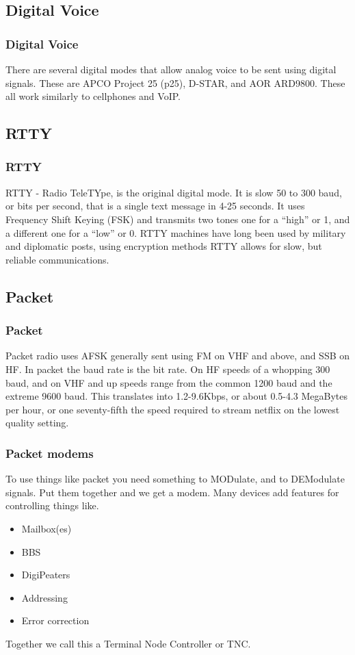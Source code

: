 \documentclass[10pt, handout]{beamer}
\begin{document}
\subsection{Digital Voice}

\begin{frame}
\frametitle{Digital Voice}
There are several digital modes that allow analog voice to be sent using digital signals. These are APCO Project 25 (p25), D-STAR, and AOR ARD9800. These all work similarly to cellphones and VoIP.
\end{frame}

\subsection{RTTY}

\begin{frame}
\frametitle{RTTY}
RTTY - Radio TeleTYpe, is the original digital mode. It is slow 50 to 300 baud, or bits per second, that is a single text message in 4-25 seconds. It uses Frequency Shift Keying (FSK) and transmits two tones one for a ``high'' or 1, and a different one for a ``low'' or 0. RTTY machines have long been used by military and diplomatic posts, using encryption methods RTTY allows for slow, but reliable communications.
\end{frame}

\subsection{Packet}

\begin{frame}
\frametitle{Packet}
Packet radio uses AFSK generally sent using FM on VHF and above, and SSB on HF. In packet the baud rate is the bit rate. On HF speeds of a whopping 300 baud, and on VHF and up speeds range from the common 1200 baud and the extreme 9600 baud. This translates into 1.2-9.6Kbps, or about 0.5-4.3 MegaBytes per hour, or one seventy-fifth the speed required to stream netflix on the lowest quality setting.
\end{frame}

\begin{frame}
\frametitle{Packet modems}
To use things like packet you need something to MODulate, and to DEModulate signals. Put them together and we get a modem. Many devices add features for controlling things like.\\
\begin{itemize}
\item Mailbox(es)
\item BBS
\item DigiPeaters
\item Addressing
\item Error correction
\end{itemize}
Together we call this a Terminal Node Controller or TNC.
\end{frame}
\end{document}
